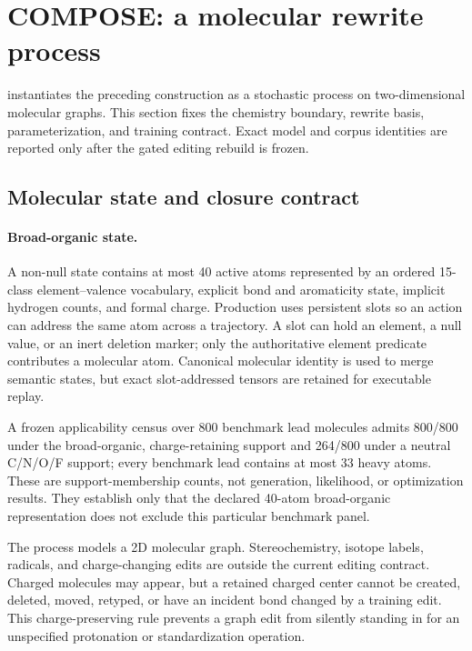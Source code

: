 \section{COMPOSE: a molecular rewrite process}
\label{sec:compose}

\method instantiates the preceding construction as a stochastic process on
two-dimensional molecular graphs. This section fixes the chemistry boundary,
rewrite basis, parameterization, and training contract. Exact model and corpus
identities are reported only after the gated editing rebuild is frozen.

\subsection{Molecular state and closure contract}

\paragraph{Broad-organic state.}
A non-null state contains at most 40 active atoms represented by an ordered
15-class element--valence vocabulary, explicit bond and aromaticity state,
implicit hydrogen counts, and formal charge. Production uses persistent slots
so an action can address the same atom across a trajectory. A slot can hold an
element, a null value, or an inert deletion marker; only the authoritative
element predicate contributes a molecular atom. Canonical molecular identity
is used to merge semantic states, but exact slot-addressed tensors are retained
for executable replay.

A frozen applicability census over 800 benchmark lead molecules admits
800/800 under the broad-organic, charge-retaining support and 264/800 under a
neutral C/N/O/F support; every benchmark lead contains at most 33 heavy atoms.
These are support-membership counts, not generation, likelihood, or
optimization results. They establish only that the declared 40-atom
broad-organic representation does not exclude this particular benchmark panel.

The process models a 2D molecular graph. Stereochemistry, isotope labels,
radicals, and charge-changing edits are outside the current editing contract.
Charged molecules may appear, but a retained charged center cannot be created,
deleted, moved, retyped, or have an incident bond changed by a training edit.
This charge-preserving rule prevents a graph edit from silently standing in for
an unspecified protonation or standardization operation.

